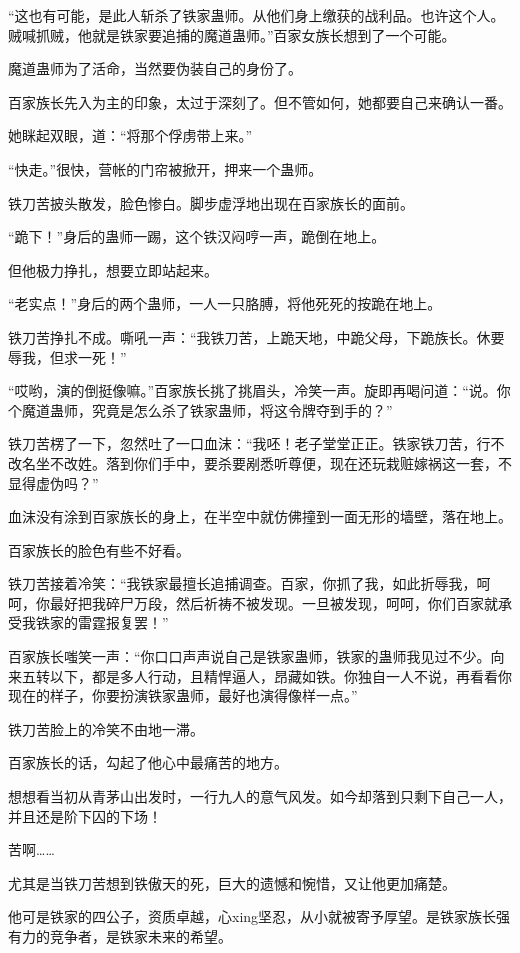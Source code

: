 \begin{this_body}
“这也有可能，是此人斩杀了铁家蛊师。从他们身上缴获的战利品。也许这个人。贼喊抓贼，他就是铁家要追捕的魔道蛊师。”百家女族长想到了一个可能。

魔道蛊师为了活命，当然要伪装自己的身份了。

百家族长先入为主的印象，太过于深刻了。但不管如何，她都要自己来确认一番。

她眯起双眼，道：“将那个俘虏带上来。”

“快走。”很快，营帐的门帘被掀开，押来一个蛊师。

铁刀苦披头散发，脸色惨白。脚步虚浮地出现在百家族长的面前。

“跪下！”身后的蛊师一踢，这个铁汉闷哼一声，跪倒在地上。

但他极力挣扎，想要立即站起来。

“老实点！”身后的两个蛊师，一人一只胳膊，将他死死的按跪在地上。

铁刀苦挣扎不成。嘶吼一声：“我铁刀苦，上跪天地，中跪父母，下跪族长。休要辱我，但求一死！”

“哎哟，演的倒挺像嘛。”百家族长挑了挑眉头，冷笑一声。旋即再喝问道：“说。你个魔道蛊师，究竟是怎么杀了铁家蛊师，将这令牌夺到手的？”

铁刀苦楞了一下，忽然吐了一口血沫：“我呸！老子堂堂正正。铁家铁刀苦，行不改名坐不改姓。落到你们手中，要杀要剐悉听尊便，现在还玩栽赃嫁祸这一套，不显得虚伪吗？”

血沫没有涂到百家族长的身上，在半空中就仿佛撞到一面无形的墙壁，落在地上。

百家族长的脸色有些不好看。

铁刀苦接着冷笑：“我铁家最擅长追捕调查。百家，你抓了我，如此折辱我，呵呵，你最好把我碎尸万段，然后祈祷不被发现。一旦被发现，呵呵，你们百家就承受我铁家的雷霆报复罢！”

百家族长嗤笑一声：“你口口声声说自己是铁家蛊师，铁家的蛊师我见过不少。向来五转以下，都是多人行动，且精悍逼人，昂藏如铁。你独自一人不说，再看看你现在的样子，你要扮演铁家蛊师，最好也演得像样一点。”

铁刀苦脸上的冷笑不由地一滞。

百家族长的话，勾起了他心中最痛苦的地方。

想想看当初从青茅山出发时，一行九人的意气风发。如今却落到只剩下自己一人，并且还是阶下囚的下场！

苦啊……

尤其是当铁刀苦想到铁傲天的死，巨大的遗憾和惋惜，又让他更加痛楚。

他可是铁家的四公子，资质卓越，心xing坚忍，从小就被寄予厚望。是铁家族长强有力的竞争者，是铁家未来的希望。


\end{this_body}
